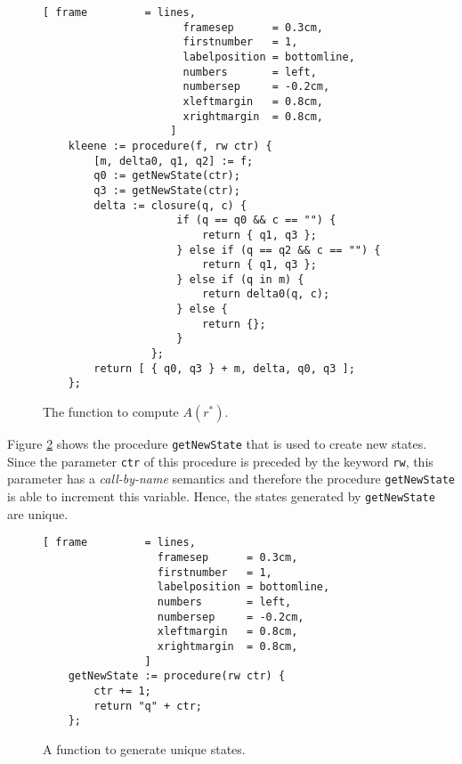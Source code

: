 \begin{enumerate}
    \begin{figure}[!ht]
    \centering
    \begin{Verbatim}[ frame         = lines, 
                      framesep      = 0.3cm, 
                      firstnumber   = 1,
                      labelposition = bottomline,
                      numbers       = left,
                      numbersep     = -0.2cm,
                      xleftmargin   = 0.8cm,
                      xrightmargin  = 0.8cm,
                    ]
    kleene := procedure(f, rw ctr) {
        [m, delta0, q1, q2] := f;
        q0 := getNewState(ctr); 
        q3 := getNewState(ctr); 
        delta := closure(q, c) {
                     if (q == q0 && c == "") {
                         return { q1, q3 };
                     } else if (q == q2 && c == "") {
                         return { q1, q3 };
                     } else if (q in m) {
                         return delta0(q, c);
                     } else {
                         return {};
                     } 
                 };
        return [ { q0, q3 } + m, delta, q0, q3 ];
    };
    \end{Verbatim}
    \vspace*{-0.3cm}
    \caption{The function to compute $A(r^*)$.}
    \label{fig:kleene.stlx}
    \end{figure}
\end{enumerate}

Figure \ref{fig:getNewState.stlx} shows the procedure \texttt{getNewState} that is used to create
new states.  Since the parameter \texttt{ctr} of this procedure is preceded by the keyword
\texttt{rw}, this parameter has a \emph{call-by-name} semantics and therefore the procedure
\texttt{getNewState} is able to increment this variable.  Hence, the states generated
by \texttt{getNewState} are unique. 

\begin{figure}[!ht]
\centering
\begin{Verbatim}[ frame         = lines, 
                  framesep      = 0.3cm, 
                  firstnumber   = 1,
                  labelposition = bottomline,
                  numbers       = left,
                  numbersep     = -0.2cm,
                  xleftmargin   = 0.8cm,
                  xrightmargin  = 0.8cm,
                ]
    getNewState := procedure(rw ctr) {
        ctr += 1;
        return "q" + ctr;
    };
\end{Verbatim}
\vspace*{-0.3cm}
\caption{A function to generate unique states.}
\label{fig:getNewState.stlx}
\end{figure}

